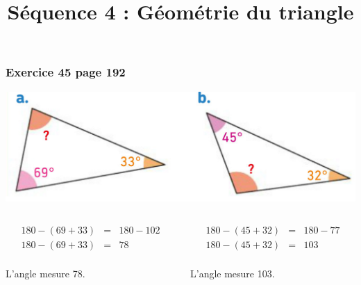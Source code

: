 \documentclass[xcolor={dvipsnames}]{beamer}
\title{Séquence 4 : Géométrie du triangle}
\begin{document}


	

\begin{frame}
	\frametitle{Exercice 45 page 192}
	
	\begin{center}
		\includegraphics[scale=0.25]{../img/exos/45}\pause
	\end{center}	
	
	
	\begin{columns}
		\begin{column}{0.5\textwidth}
			\begin{eqnarray*}
				180 - (69 + 33) &=& 180 - 102 \\
				180 - (69 + 33) &=& 78\\
			\end{eqnarray*}
			
			L'angle mesure 78\degree.\pause
		\end{column}
	
		\begin{column}{0.5\textwidth}
			\begin{eqnarray*}
			180 - (45 + 32) &=& 180 - 77 \\
			180 - (45 + 32) &=& 103\\
			\end{eqnarray*}
		
			L'angle mesure 103\degree.
		\end{column}

	\end{columns}
\end{frame}
\end{document}
